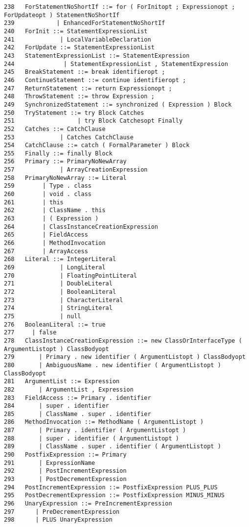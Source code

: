 {\begin{verbatim}
238   ForStatementNoShortIf ::= for ( ForInitopt ; Expressionopt ; ForUpdateopt ) StatementNoShortIf
239            | EnhancedForStatementNoShortIf
240   ForInit ::= StatementExpressionList
241             | LocalVariableDeclaration
242   ForUpdate ::= StatementExpressionList
243   StatementExpressionList ::= StatementExpression
244              | StatementExpressionList , StatementExpression
245   BreakStatement ::= break identifieropt ;
246   ContinueStatement ::= continue identifieropt ;
247   ReturnStatement ::= return Expressionopt ;
248   ThrowStatement ::= throw Expression ;
249   SynchronizedStatement ::= synchronized ( Expression ) Block
250   TryStatement ::= try Block Catches
251                  | try Block Catchesopt Finally
252   Catches ::= CatchClause
253             | Catches CatchClause
254   CatchClause ::= catch ( FormalParameter ) Block
255   Finally ::= finally Block
256   Primary ::= PrimaryNoNewArray
257             | ArrayCreationExpression
258   PrimaryNoNewArray ::= Literal
259        | Type . class
260        | void . class
261        | this
262        | ClassName . this
263        | ( Expression )
264        | ClassInstanceCreationExpression
265        | FieldAccess
266        | MethodInvocation
267        | ArrayAccess
268   Literal ::= IntegerLiteral
269             | LongLiteral
270             | FloatingPointLiteral
271             | DoubleLiteral
272             | BooleanLiteral
273             | CharacterLiteral
274             | StringLiteral
275             | null
276   BooleanLiteral ::= true
277     | false
278   ClassInstanceCreationExpression ::= new ClassOrInterfaceType ( ArgumentListopt ) ClassBodyopt
279       | Primary . new identifier ( ArgumentListopt ) ClassBodyopt
280       | AmbiguousName . new identifier ( ArgumentListopt ) ClassBodyopt
281   ArgumentList ::= Expression
282       | ArgumentList , Expression
283   FieldAccess ::= Primary . identifier
284       | super . identifier
285       | ClassName . super . identifier
286   MethodInvocation ::= MethodName ( ArgumentListopt )
287       | Primary . identifier ( ArgumentListopt )
288       | super . identifier ( ArgumentListopt )
289       | ClassName . super . identifier ( ArgumentListopt )
290   PostfixExpression ::= Primary
291       | ExpressionName
292       | PostIncrementExpression
293       | PostDecrementExpression
294   PostIncrementExpression ::= PostfixExpression PLUS_PLUS
295   PostDecrementExpression ::= PostfixExpression MINUS_MINUS
296   UnaryExpression ::= PreIncrementExpression
297      | PreDecrementExpression
298      | PLUS UnaryExpression

\end{verbatim}}
